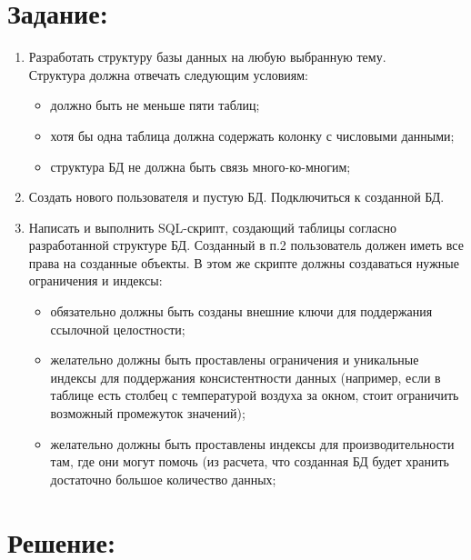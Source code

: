 \documentclass[oneside,a4paper,14pt]{extarticle} %
\begin{document}
\section{Задание:}
\begin{enumerate}
	\item Разработать структуру базы данных на любую выбранную тему. \\
	      {Структура должна отвечать следующим условиям: }
	      \begin{itemize}
	      	\item  должно быть не меньше пяти таблиц;
	       	\item  хотя бы одна таблица должна содержать  колонку с числовыми данными;
	      	\item  структура БД не должна быть связь много-ко-многим; \\
	      \end{itemize}

	\item Создать нового пользователя и пустую БД. Подключиться к созданной БД.  \\
	
	\item Написать и выполнить SQL-скрипт, создающий таблицы согласно разработанной структуре БД. Созданный в п.2 пользователь должен иметь все права на созданные объекты. В этом же скрипте должны создаваться нужные ограничения и индексы:   \\
	
	\begin{itemize}
		\item обязательно должны быть созданы внешние ключи для поддержания ссылочной целостности; 
		\item желательно должны быть проставлены ограничения и уникальные индексы для поддержания консистентности данных (например, если в таблице есть столбец с температурой воздуха за окном, стоит ограничить возможный промежуток значений); 
		\item желательно должны быть проставлены индексы для производительности там, где они могут помочь (из расчета, что созданная БД будет хранить достаточно большое количество данных;
	\end{itemize}


\end{enumerate}


\newpage
\section{Решение:}
\end{document}
